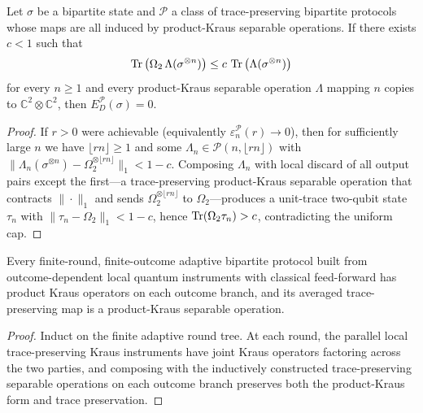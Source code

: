 \begin{lemma}
\label{lem:zero}
\leanok
{}
Let $\sigma$ be a bipartite state and $\mathcal{P}$ a class of trace-preserving bipartite protocols whose maps are all induced by product-Kraus separable operations. If there exists $c<1$ such that
\[
  \operatorname{Tr}\big(\Omega_2\,\Lambda(\sigma^{\otimes n})\big)
  \le c\,\operatorname{Tr}\big(\Lambda(\sigma^{\otimes n})\big)
\]
for every $n\ge 1$ and every product-Kraus separable operation $\Lambda$ mapping $n$ copies to $\mathbb{C}^2\otimes\mathbb{C}^2$, then $E_D^{\mathcal{P}}(\sigma)=0$.
\end{lemma}
\begin{proof}
\leanok
If $r>0$ were achievable (equivalently $\varepsilon_n^{\mathcal{P}}(r)\to 0$), then for sufficiently large $n$ we have $\lfloor rn\rfloor\ge 1$ and some $\Lambda_n\in\mathcal{P}(n,\lfloor rn\rfloor)$ with $\|\Lambda_n(\sigma^{\otimes n}) - \Omega_2^{\otimes\lfloor rn\rfloor}\|_1 < 1-c$. Composing $\Lambda_n$ with local discard of all output pairs except the first---a trace-preserving product-Kraus separable operation that contracts $\|\cdot\|_1$ and sends $\Omega_2^{\otimes\lfloor rn\rfloor}$ to $\Omega_2$---produces a unit-trace two-qubit state $\tau_n$ with $\|\tau_n - \Omega_2\|_1 < 1-c$, hence $\operatorname{Tr}(\Omega_2\tau_n) > c$, contradicting the uniform cap.
\end{proof}

\begin{lemma}
\label{lem:locc}
\leanok
{}
Every finite-round, finite-outcome adaptive bipartite protocol built from outcome-dependent local quantum instruments with classical feed-forward has product Kraus operators on each outcome branch, and its averaged trace-preserving map is a product-Kraus separable operation.
\end{lemma}
\begin{proof}
\leanok
Induct on the finite adaptive round tree. At each round, the parallel local trace-preserving Kraus instruments have joint Kraus operators factoring across the two parties, and composing with the inductively constructed trace-preserving separable operations on each outcome branch preserves both the product-Kraus form and trace preservation.
\end{proof}

